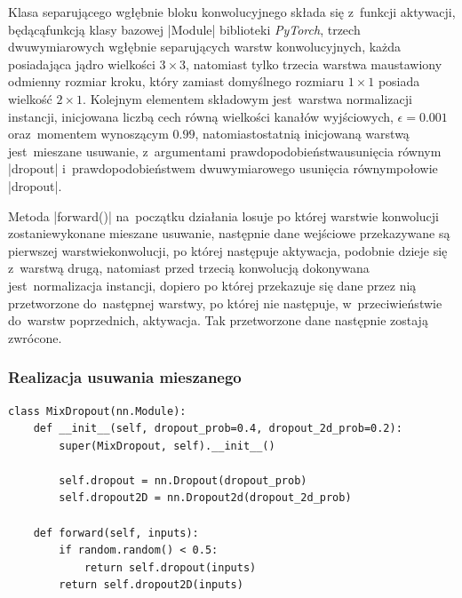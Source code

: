Klasa separującego wgłębnie bloku konwolucyjnego składa się z~funkcji aktywacji, będącą\linebreak funkcją klasy bazowej \pyth|Module| biblioteki \textit{PyTorch}, trzech dwuwymiarowych wgłębnie separujących warstw konwolucyjnych, każda posiadająca jądro wielkości $3 \times 3$, natomiast tylko trzecia warstwa ma\linebreak ustawiony odmienny rozmiar kroku, który zamiast domyślnego rozmiaru $1 \times 1$ posiada wielkość $2 \times 1$. Kolejnym elementem składowym jest~warstwa normalizacji instancji, inicjowana liczbą cech równą wielkości kanałów wyjściowych, $\epsilon = 0.001$ oraz~momentem wynoszącym $0.99$, natomiast\linebreak ostatnią inicjowaną warstwą jest~mieszane usuwanie, z~argumentami prawdopodobieństwa\linebreak usunięcia równym \pyth|dropout| i~prawdopodobieństwem dwuwymiarowego usunięcia równym\linebreak połowie \pyth|dropout|.

Metoda \pyth|forward()| na~początku działania losuje po której warstwie konwolucji zostanie\linebreak wykonane mieszane usuwanie, następnie dane wejściowe przekazywane są pierwszej warstwie\linebreak konwolucji, po której następuje aktywacja, podobnie dzieje się z~warstwą drugą, natomiast przed trzecią konwolucją dokonywana jest~normalizacja instancji, dopiero po której przekazuje się dane przez nią przetworzone do~następnej warstwy, po której nie następuje, w~przeciwieństwie do~warstw poprzednich, aktywacja. Tak przetworzone dane następnie zostają zwrócone.



\subsubsection{Realizacja usuwania mieszanego}

\begin{lstlisting}[caption={\pyth|MixDroput| - klasa usuwania mieszanego.}, label={mix-dropout}]
class MixDropout(nn.Module):
	def __init__(self, dropout_prob=0.4, dropout_2d_prob=0.2):
		super(MixDropout, self).__init__()
		
		self.dropout = nn.Dropout(dropout_prob)
		self.dropout2D = nn.Dropout2d(dropout_2d_prob)
	
	def forward(self, inputs):
		if random.random() < 0.5:
			return self.dropout(inputs)
		return self.dropout2D(inputs)
\end{lstlisting}

